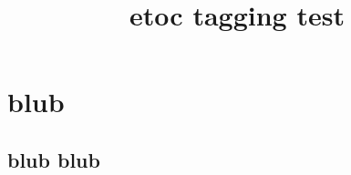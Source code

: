 \documentclass{article}
\title{etoc tagging test}
\begin{document}
\tableofcontents

\section{blub}
\subsection{blub blub}
\end{document}
